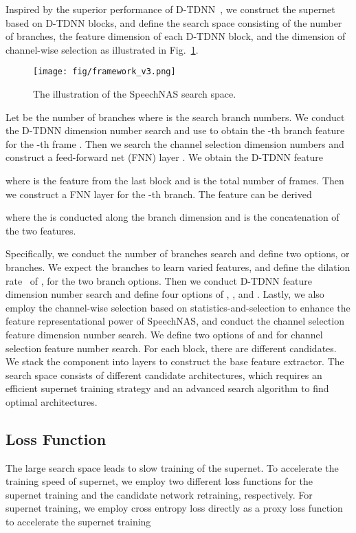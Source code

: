 \documentclass{article}
\begin{document}
Inspired by the superior performance of D-TDNN~\cite{yu2020densely}, we construct the supernet based on D-TDNN blocks, and define the search space  consisting of the number of branches, the feature dimension of each D-TDNN block, and the dimension of channel-wise selection as illustrated in Fig.~\ref{fig:search_space}.
\begin{figure}[t]
\begin{minipage}[b]{1.0\linewidth}
  \centering
  \centerline{\texttt{[image: fig/framework\_v3.png]}}
\end{minipage}
\caption{The illustration of the SpeechNAS search space.}
\label{fig:search_space}
\end{figure}

Let  be the number of branches where  is the search branch numbers. We conduct the D-TDNN dimension number search and use  to obtain the -th branch feature for the -th frame . Then we search the channel selection dimension numbers and construct a feed-forward net (FNN) layer . We obtain the D-TDNN feature 

where  is the feature from the last block and  is the total number of frames. Then we construct a FNN layer  for the -th branch. The feature  can be derived

where the  is conducted along the branch dimension and  is the concatenation of the two features.

Specifically, we conduct the number of branches  search and define two options,  or  branches. We expect the branches to learn varied features, and define the dilation rate~\cite{yu2017dilated} of ,  for the two branch options. Then we conduct D-TDNN feature dimension number  search and define four options of , ,  and . Lastly, we also employ the channel-wise selection based on statistics-and-selection to enhance the feature representational power of SpeechNAS, and conduct the channel selection feature dimension number  search. We define two options of  and  for channel selection feature number search. For each block, there are  different candidates. We stack the component into  layers to construct the base feature extractor. The search space consists of  different candidate architectures, which requires an efficient supernet training strategy and an advanced search algorithm to find optimal architectures.  

\subsection{Loss Function}\label{sec:loss_function}
The large search space leads to slow training of the supernet. To accelerate the training speed of supernet, we employ two different loss functions for the supernet training and the candidate network retraining, respectively. For supernet training, we employ cross entropy loss directly as a proxy loss function to accelerate the supernet training
\end{document}
